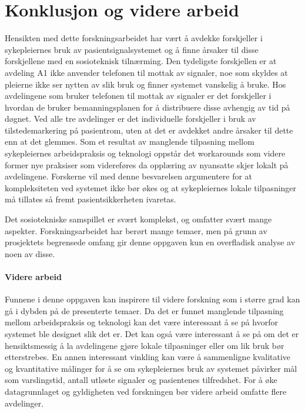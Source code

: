 \chapter{Konklusjon og videre arbeid}
\label{chp:konklusjon} 
Hensikten med dette forskningsarbeidet har vært å avdekke forskjeller i sykepleiernes bruk av pasientsignalsystemet og å finne årsaker til disse forskjellene med en sosioteknisk tilnærming. Den tydeligste forskjellen er at avdeling A1 ikke anvender telefonen til mottak av signaler, noe som skyldes at pleierne ikke ser nytten av slik bruk og finner systemet vanskelig å bruke. Hos avdelingene som bruker telefonen til mottak av signaler er det forskjeller i hvordan de bruker bemanningsplanen for å distribuere disse avhengig av tid på døgnet. Ved alle tre avdelinger er det individuelle forskjeller i bruk av tilstedemarkering på pasientrom, uten at det er avdekket andre årsaker til dette enn at det glemmes. Som et resultat av manglende tilpasning mellom sykepleiernes arbeidspraksis og teknologi oppstår det workarounds som videre former nye praksiser som videreføres da opplæring av nyansatte skjer lokalt på avdelingene. Forskerne vil med denne besvarelsen argumentere for at kompleksiteten ved systemet ikke bør økes og at sykepleiernes lokale tilpasninger må tillates så fremt pasientsikkerheten ivaretas.

\noindent
Det sosiotekniske samspillet er svært komplekst, og omfatter svært mange aspekter. Forskningsarbeidet har berørt mange temaer, men på grunn av prosjektets begrensede omfang gir denne oppgaven kun en overfladisk analyse av noen av disse. 

\subsubsection{Videre arbeid}
Funnene i denne oppgaven kan inspirere til videre forskning som i større grad kan gå i dybden på de presenterte temaer. Da det er funnet manglende tilpasning mellom arbeidspraksis og teknologi kan det være interessant å se på hvorfor systemet ble designet slik det er. Det kan også være interessant å se på om det er hensiktsmessig å la avdelingene gjøre lokale tilpasninger eller om lik bruk bør etterstrebes. En annen interessant vinkling kan være å sammenligne kvalitative og kvantitative målinger for å se om sykepleiernes bruk av systemet påvirker mål som varslingstid, antall utløste signaler og pasientenes tilfredshet. For å øke datagrunnlaget og gyldigheten ved forskningen bør videre arbeid omfatte flere avdelinger. 
